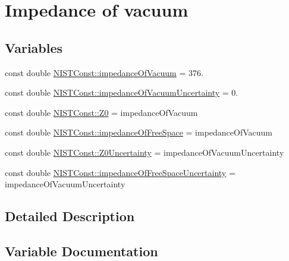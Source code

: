 \hypertarget{group___impedance_of_vacuum}{}\section{Impedance of vacuum}
\label{group___impedance_of_vacuum}
\subsection*{Variables}
\begin{DoxyCompactItemize}
\item 
const double \hyperlink{group___impedance_of_vacuum_ga51e1aede5d89041ea7423522b526dd0e}{N\+I\+S\+T\+Const\+::impedance\+Of\+Vacuum} = 376.
\item 
const double \hyperlink{group___impedance_of_vacuum_ga0d686b0016dc8c1f0bda161283b4f9c5}{N\+I\+S\+T\+Const\+::impedance\+Of\+Vacuum\+Uncertainty} = 0.
\item 
const double \hyperlink{group___impedance_of_vacuum_ga0de5c47b3a38d72c61aac5574ea154ca}{N\+I\+S\+T\+Const\+::\+Z0} = impedance\+Of\+Vacuum
\item 
const double \hyperlink{group___impedance_of_vacuum_ga299cd5a5d3a7df43dd6b8c8335bbc8c6}{N\+I\+S\+T\+Const\+::impedance\+Of\+Free\+Space} = impedance\+Of\+Vacuum
\item 
const double \hyperlink{group___impedance_of_vacuum_gaa511043a811bd20587a1903b52aa6dc7}{N\+I\+S\+T\+Const\+::\+Z0\+Uncertainty} = impedance\+Of\+Vacuum\+Uncertainty
\item 
const double \hyperlink{group___impedance_of_vacuum_ga16b669e68f98b1314ca4df5973203147}{N\+I\+S\+T\+Const\+::impedance\+Of\+Free\+Space\+Uncertainty} = impedance\+Of\+Vacuum\+Uncertainty
\end{DoxyCompactItemize}


\subsection{Detailed Description}


\subsection{Variable Documentation}
\mbox{\label{group___impedance_of_vacuum_ga299cd5a5d3a7df43dd6b8c8335bbc8c6}} 
